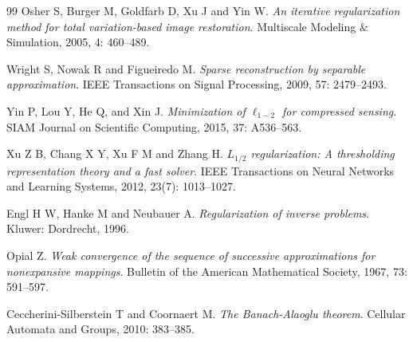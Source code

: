\documentclass[a4paper,12pt]{article}
\numberwithin{equation}{section}
\begin{document}
\begin{thebibliography}{99}
Osher S, Burger M, Goldfarb D, Xu J and Yin W. \emph{An iterative regularization method for total variation-based image restoration}. Multiscale Modeling \& Simulation, 2005, 4: 460--489.

Wright S, Nowak R and Figueiredo M. \emph{Sparse reconstruction by separable approximation}. IEEE Transactions on Signal Processing, 2009, 57: 2479--2493.

Yin P, Lou Y, He Q, and Xin J. \emph{Minimization of $\ell_{1-2}$ for compressed sensing}. SIAM Journal on Scientific Computing, 2015, 37: A536--563.

Xu Z B, Chang X Y, Xu F M and Zhang H. \emph{$L_{1/2}$ regularization: A thresholding representation theory and a fast solver}. IEEE Transactions on Neural Networks and Learning Systems, 2012, 23(7): 1013--1027.

Engl H W, Hanke M and Neubauer A. \emph{Regularization of inverse problems}. Kluwer: Dordrecht, 1996.

Opial Z. \emph{Weak convergence of the sequence of successive approximations for nonexpansive mappings}. Bulletin of the American Mathematical Society, 1967, 73: 591--597.

Ceccherini-Silberstein T and Coornaert M. \emph{The Banach-Alaoglu theorem}. Cellular Automata and Groups, 2010: 383--385.

\end{thebibliography}
\end{document}
